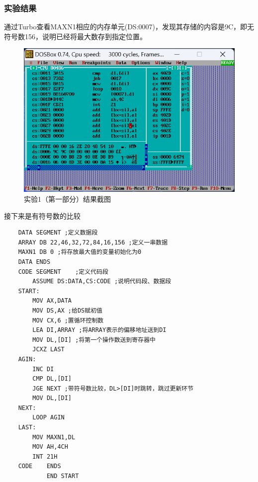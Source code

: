 \documentclass[12pt, a4paper, oneside]{ctexart}
\begin{document}
\subsubsection{实验结果}
通过Turbo查看MAXN1相应的内存单元(DS:0007)，发现其存储的内容是9C，即无符号数156，说明已经将最大数存到指定位置。
\begin{figure}[H]
    \centering
    \includegraphics[scale=0.6]{pic/exp1_1_outcome.png}
    \caption{实验1（第一部分）结果截图}
\end{figure}
接下来是有符号数的比较
\begin{lstlisting}
    DATA SEGMENT ;定义数据段
    ARRAY DB 22,46,32,72,84,16,156 ;定义一串数据
    MAXN1 DB 0 ;将存放最大值的变量初始化为0 
    DATA ENDS
    CODE SEGMENT 	;定义代码段
        ASSUME DS:DATA,CS:CODE ;说明代码段、数据段
    START: 
        MOV AX,DATA 
        MOV DS,AX ;给DS赋初值
        MOV CX,6 ;置循环控制数
        LEA DI,ARRAY ;将ARRAY表示的偏移地址送到DI
        MOV DL,[DI] ;将第一个操作数送到寄存器中
        JCXZ LAST 
    AGIN:
        INC DI
        CMP DL,[DI]
        JGE NEXT ;带符号数比较，DL>[DI]时跳转，跳过更新环节
        MOV DL,[DI]
    NEXT:
        LOOP AGIN
    LAST:
        MOV MAXN1,DL
        MOV AH,4CH
        INT 21H
    CODE 	ENDS
            END START
\end{lstlisting}
\end{document}

